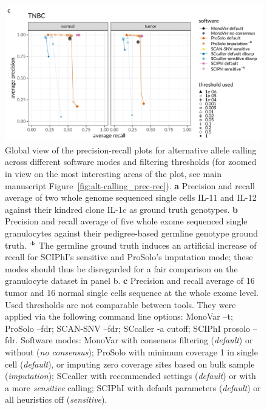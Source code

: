 \documentclass[authoryear,preprint,11pt]{scrartcl}
\begin{document}
\begin{figure}[!tpb]
\begin{minipage}{.9\linewidth}
  \includegraphics[height=42ex]{figs/Wang2014/Wang2014_prosolo-monovar-scansnv-sccaller-scvilp_precision-recall-plot.pdf} \newline
 \end{minipage}
 \caption{
  Global view of the precision-recall plots for alternative allele calling across different software modes and filtering thresholds (for zoomed in view on the most interesting areas of the plot, see main manuscript Figure~\ref{fig:alt-calling_prec-rec}).
  \textbf{a} Precision and recall average of two whole genome sequenced single cells IL-11 and IL-12 against their kindred clone IL-1c as ground truth genotypes.
  \textbf{b} Precision and recall average of five whole exome sequenced single granulocytes against their pedigree-based germline genotype ground truth.\newline 
  $^\text{\sffamily-b}$ The germline ground truth induces an artificial increase of recall for SCIPhI's sensitive and ProSolo's imputation mode; these modes should thus be disregarded for a fair comparison on the granulocyte dataset in panel b.\newline
  \textbf{c} Precision and recall average of 16 tumor and 16 normal single cells sequence at the whole exome level. \newline \footnotesize
  Used thresholds are not comparable between tools.
  They were applied via the following command line options:
  MonoVar {\ttfamily --t};
  ProSolo {\ttfamily --fdr};
  SCAN-SNV {\ttfamily --fdr};
  SCcaller {\ttfamily -a cutoff};
  SCIPhI {\ttfamily prosolo --fdr}.
  Software modes:
  MonoVar with consensus filtering ({\itshape default}) or without ({\itshape no consensus});
  ProSolo with minimum coverage 1 in single cell ({\itshape default}), or imputing zero coverage sites based on bulk sample ({\itshape imputation});
  SCcaller with recommended settings ({\itshape default}) or with a more {\itshape sensitive} calling;
  SCIPhI with default parameters ({\itshape default}) or all heuristics off ({\itshape sensitive}).
  }
 \label{fig:alt-calling_prec-rec_global}
\end{figure}
\end{document}
